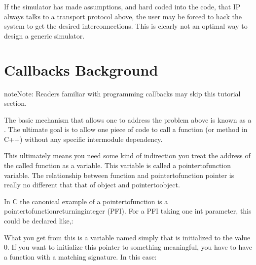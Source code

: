 \documentclass[letterpaper,10pt,english]{sphinxmanual}
\renewcommand{\sphinxcode}[1]{\texttt{\small{#1}}}
\begin{document}
If the simulator has made assumptions, and hard coded into the code, that IP
always talks to a transport protocol above, the user may be forced to hack the
system to get the desired interconnections. This is clearly not an optimal way
to design a generic simulator.


\section{Callbacks Background}
\label{\detokenize{callbacks:callbacks-background}}
\begin{sphinxadmonition}{note}{Note:}
Readers familiar with programming callbacks may skip this tutorial
section.
\end{sphinxadmonition}

The basic mechanism that allows one to address the problem above is known as a
. The ultimate goal is to allow one piece of code to call a function
(or method in C++) without any specific inter\sphinxhyphen{}module dependency.

This ultimately means you need some kind of indirection \textendash{} you treat the address
of the called function as a variable.  This variable is called a
pointer\sphinxhyphen{}to\sphinxhyphen{}function variable. The relationship between function and
pointer\sphinxhyphen{}to\sphinxhyphen{}function pointer is really no different that that of object and
pointer\sphinxhyphen{}to\sphinxhyphen{}object.

In C the canonical example of a pointer\sphinxhyphen{}to\sphinxhyphen{}function is a
pointer\sphinxhyphen{}to\sphinxhyphen{}function\sphinxhyphen{}returning\sphinxhyphen{}integer (PFI). For a PFI taking one int parameter,
this could be declared like,:

\begin{sphinxVerbatim}[commandchars=\\\{\}]
    
\end{sphinxVerbatim}

What you get from this is a variable named simply \sphinxcode{} that is initialized to
the value 0. If you want to initialize this pointer to something meaningful, you
have to have a function with a matching signature. In this case:

\begin{sphinxVerbatim}[commandchars=\\\{\}]
    
\end{sphinxVerbatim}
\end{document}
